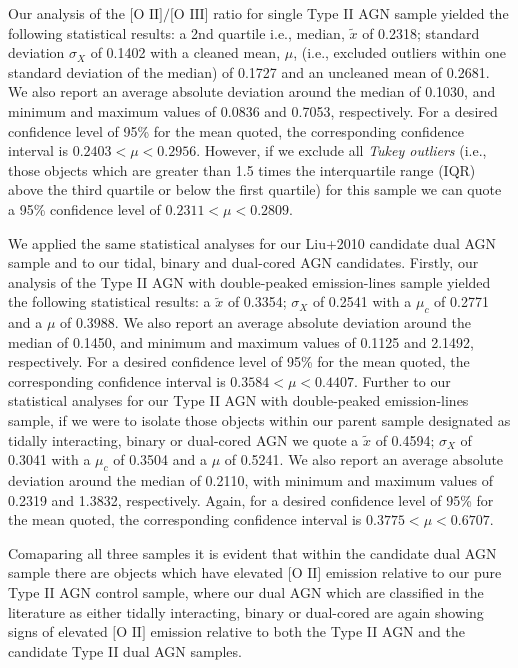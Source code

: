 Our analysis of the $\text{[O II]/[O III]}$ ratio for single Type II AGN sample yielded the following statistical results: a 2nd quartile i.e., median, $\tilde{x}$ of 0.2318; standard deviation $\sigma_{X}$ of 0.1402 with a cleaned mean, $\mu$, (i.e., excluded outliers within one standard deviation of the median) of 0.1727 and an uncleaned mean of 0.2681. We also report an average absolute deviation around the median of 0.1030, and minimum and maximum values of 0.0836 and 0.7053, respectively. For a desired confidence level of 95\% for the mean quoted, the corresponding confidence interval is ${0.2403}<{\mu}<{0.2956}$. However, if we exclude all \textit{Tukey outliers} (i.e., those objects which are greater than 1.5 times the interquartile range (IQR) above the third quartile or below the first quartile) for this sample we can quote a 95\% confidence level of ${0.2311}<{\mu}<{0.2809}$.

We applied the same statistical analyses for our Liu+2010 candidate dual AGN sample and to our tidal, binary and dual-cored AGN candidates. Firstly, our analysis of the Type II AGN with double-peaked emission-lines sample yielded the following statistical results: a $\tilde{x}$ of 0.3354; $\sigma_{X}$ of 0.2541 with a $\mu_{c}$ of 0.2771 and a $\mu$ of 0.3988. We also report an average absolute deviation around the median of 0.1450, and minimum and maximum values of 0.1125 and 2.1492, respectively. For a desired confidence level of 95\% for the mean quoted, the corresponding confidence interval is ${0.3584}<{\mu}<{0.4407}$. Further to our statistical analyses for our Type II AGN with double-peaked emission-lines sample, if we were to isolate those objects within our parent sample designated as tidally interacting, binary or dual-cored AGN we quote a $\tilde{x}$ of 0.4594; $\sigma_{X}$ of 0.3041 with a $\mu_{c}$ of 0.3504 and a $\mu$ of 0.5241. We also report an average absolute deviation around the median of 0.2110, with minimum and maximum values of 0.2319 and 1.3832, respectively. Again, for a desired confidence level of 95\% for the mean quoted, the corresponding confidence interval is ${0.3775}<{\mu}<{0.6707}$.

Comaparing all three samples it is evident that within the candidate dual AGN sample there are objects which have elevated $\text{[O II]}$ emission relative to our pure Type II AGN control sample, where our dual AGN which are classified in the literature as either tidally interacting, binary or dual-cored are again showing signs of elevated $\text{[O II]}$ emission relative to both the Type II AGN and the candidate Type II dual AGN samples.
 
